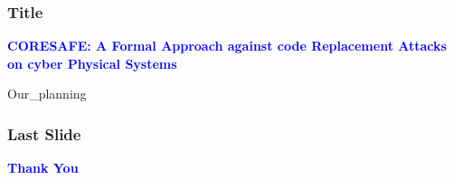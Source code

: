 \documentclass[10pt]{beamer}
\begin{document}
\begin{frame}
\frametitle{Title}
\begin{center}

\textbf{\textcolor{blue}{CORESAFE: A Formal Approach against code Replacement
Attacks on cyber Physical Systems}}

\end{center}

\end{frame}





































 {Our_planning}
%

%

%

\begin{frame}
 \frametitle{Last Slide}
 \begin{center}
   \textbf{\textcolor{blue}{Thank You}}
 \end{center}


\end{frame}
\end{document}
